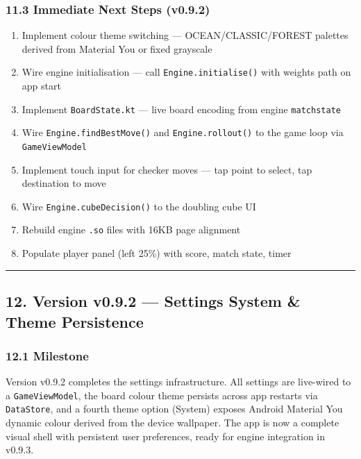 \documentclass[11pt,a4paper]{article}
\providecommand{\tightlist}{\setlength{\itemsep}{2pt}\setlength{\parskip}{0pt}}
\begin{document}
\subsubsection{11.3 Immediate Next Steps
(v0.9.2)}\label{immediate-next-steps-v092}

\begin{enumerate}
\def\labelenumi{\arabic{enumi}.}
\tightlist
\item
  Implement colour theme switching --- OCEAN/CLASSIC/FOREST palettes
  derived from Material You or fixed grayscale
\item
  Wire engine initialisation --- call \texttt{Engine.initialise()}
  with weights path on app start
\item
  Implement \texttt{BoardState.kt} --- live board encoding from
  engine \texttt{matchstate}
\item
  Wire \texttt{Engine.findBestMove()} and \texttt{Engine.rollout()}
  to the game loop via \texttt{GameViewModel}
\item
  Implement touch input for checker moves --- tap point to select,
  tap destination to move
\item
  Wire \texttt{Engine.cubeDecision()} to the doubling cube UI
\item
  Rebuild engine \texttt{.so} files with 16KB page alignment
\item
  Populate player panel (left 25\%) with score, match state, timer
\end{enumerate}

\begin{center}\rule{0.5\linewidth}{0.5pt}\end{center}

\subsection{12. Version v0.9.2 --- Settings System \& Theme
Persistence}\label{version-v092-settings-theme}

\subsubsection{12.1 Milestone}\label{milestone-v092}

Version v0.9.2 completes the settings infrastructure. All settings are
live-wired to a \texttt{GameViewModel}, the board colour theme persists
across app restarts via \texttt{DataStore}, and a fourth theme option
(System) exposes Android Material You dynamic colour derived from the
device wallpaper. The app is now a complete visual shell with persistent
user preferences, ready for engine integration in v0.9.3.
\end{document}
